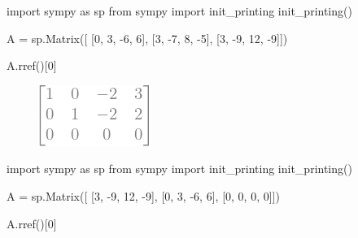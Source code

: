 \documentclass[
  letterpaper,
  DIV=11,
  numbers=noendperiod]{scrreprt}
\newenvironment{Shaded}{\begin{snugshade}}{\end{snugshade}}
\newcommand{\DecValTok}[1]{\textcolor[rgb]{0.68,0.00,0.00}{#1}}
\newcommand{\ImportTok}[1]{\textcolor[rgb]{0.00,0.46,0.62}{#1}}
\newcommand{\NormalTok}[1]{\textcolor[rgb]{0.00,0.23,0.31}{#1}}
\newcommand{\OperatorTok}[1]{\textcolor[rgb]{0.37,0.37,0.37}{#1}}
\begin{document}
\begin{Shaded}
\begin{Highlighting}[]
\ImportTok{import}\NormalTok{ sympy }\ImportTok{as}\NormalTok{ sp  }
\ImportTok{from}\NormalTok{ sympy }\ImportTok{import}\NormalTok{ init\_printing}
\NormalTok{init\_printing()}

\NormalTok{A }\OperatorTok{=}\NormalTok{ sp.Matrix([}
\NormalTok{    [}\DecValTok{0}\NormalTok{,  }\DecValTok{3}\NormalTok{,  }\OperatorTok{{-}}\DecValTok{6}\NormalTok{,   }\DecValTok{6}\NormalTok{], }
\NormalTok{    [}\DecValTok{3}\NormalTok{, }\OperatorTok{{-}}\DecValTok{7}\NormalTok{,   }\DecValTok{8}\NormalTok{,  }\OperatorTok{{-}}\DecValTok{5}\NormalTok{], }
\NormalTok{    [}\DecValTok{3}\NormalTok{, }\OperatorTok{{-}}\DecValTok{9}\NormalTok{,  }\DecValTok{12}\NormalTok{,  }\OperatorTok{{-}}\DecValTok{9}\NormalTok{]])}

\NormalTok{A.rref()[}\DecValTok{0}\NormalTok{]}
\end{Highlighting}
\end{Shaded}

\begin{figure}[H]

{\centering \includegraphics{p2_files/figure-pdf/cell-3-output-1.png}

}

\end{figure}

\begin{Shaded}
\begin{Highlighting}[]
\ImportTok{import}\NormalTok{ sympy }\ImportTok{as}\NormalTok{ sp  }
\ImportTok{from}\NormalTok{ sympy }\ImportTok{import}\NormalTok{ init\_printing}
\NormalTok{init\_printing()}

\NormalTok{A }\OperatorTok{=}\NormalTok{ sp.Matrix([}
\NormalTok{    [}\DecValTok{3}\NormalTok{, }\OperatorTok{{-}}\DecValTok{9}\NormalTok{,  }\DecValTok{12}\NormalTok{,  }\OperatorTok{{-}}\DecValTok{9}\NormalTok{], }
\NormalTok{    [}\DecValTok{0}\NormalTok{,  }\DecValTok{3}\NormalTok{,  }\OperatorTok{{-}}\DecValTok{6}\NormalTok{,   }\DecValTok{6}\NormalTok{],}
\NormalTok{    [}\DecValTok{0}\NormalTok{,  }\DecValTok{0}\NormalTok{,   }\DecValTok{0}\NormalTok{,   }\DecValTok{0}\NormalTok{]])}

\NormalTok{A.rref()[}\DecValTok{0}\NormalTok{]}
\end{Highlighting}
\end{Shaded}
\end{document}
